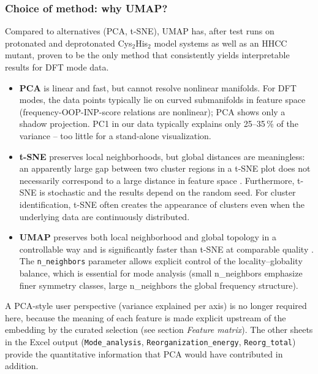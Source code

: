 \documentclass[11pt,a4paper,twoside]{article}
\theoremstyle{remark}
\begin{document}
\subsubsection*{Choice of method: why UMAP?}

Compared to alternatives (PCA, t-SNE), UMAP has, after test runs on
protonated and deprotonated Cys$_2$His$_2$ model systems as well
as an HHCC mutant, proven to be the only method that consistently
yields interpretable results for DFT mode data.

\begin{itemize}
  \item \textbf{PCA} \cite{Pearson1901,Hotelling1933,Jolliffe2002}
        is linear and fast, but cannot resolve nonlinear manifolds.
        For DFT modes, the data points typically lie on curved
        submanifolds in feature space (frequency-OOP-INP-score
        relations are nonlinear); PCA shows only a shadow
        projection. PC1 in our data typically explains only
        25--35\,\% of the variance -- too little for a stand-alone
        visualization.

  \item \textbf{t-SNE} \cite{vanDerMaaten2008,vanDerMaaten2014}
        preserves local neighborhoods, but global distances are
        meaningless: an apparently large gap between two cluster
        regions in a t-SNE plot does not necessarily correspond to
        a large distance in feature space \cite{vanDerMaaten2008}.
        Furthermore, t-SNE is stochastic and the results depend on
        the random seed. For cluster identification, t-SNE often
        creates the appearance of clusters even when the
        underlying data are continuously distributed.

  \item \textbf{UMAP} \cite{McInnes2018,Becht2019} preserves both
        local neighborhood and global topology in a controllable
        way and is significantly faster than t-SNE at comparable
        quality \cite{Becht2019}. The \texttt{n\_neighbors}
        parameter allows explicit control of the locality--globality
        balance, which is essential for mode analysis (small
        n\_neighbors emphasize finer symmetry classes, large
        n\_neighbors the global frequency structure).
\end{itemize}

A PCA-style user perspective (variance explained per axis) is no
longer required here, because the meaning of each feature is made
explicit upstream of the embedding by the curated selection (see
section \emph{Feature matrix}). The other sheets in the Excel
output (\texttt{Mode\_analysis}, \texttt{Reorganization\_energy},
\texttt{Reorg\_total}) provide the quantitative information that
PCA would have contributed in addition.
\end{document}
